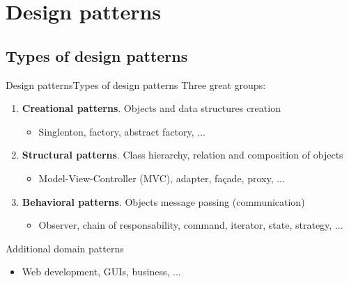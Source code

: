 \documentclass[10pt,compress]{beamer} %
\begin{document}
\section[Design patterns]{Design patterns}
\subsection[Types of design patterns]{Types of design patterns}
\begin{frame}{Design patterns}{Types of design patterns}
	Three great groups:
	\begin{enumerate}
		\item \textbf{Creational patterns}. Objects and data structures creation
			\begin{itemize}
			\item Singlenton, factory, abstract factory, ...
			\end{itemize}
		\item \textbf{Structural patterns}. Class hierarchy, relation and composition of objects
			\begin{itemize}
			\item Model-View-Controller (MVC), adapter, fa\c{c}ade, proxy, ...
			\end{itemize}
		\item \textbf{Behavioral patterns}. Objects message passing (communication)
			\begin{itemize}
			\item Observer, chain of responsability, command, iterator, state, strategy, ...
			\end{itemize}
	\end{enumerate}
	Additional domain patterns
	\begin{itemize}
		\item Web development, GUIs, business, ...
	\end{itemize}
\end{frame}
\end{document}
